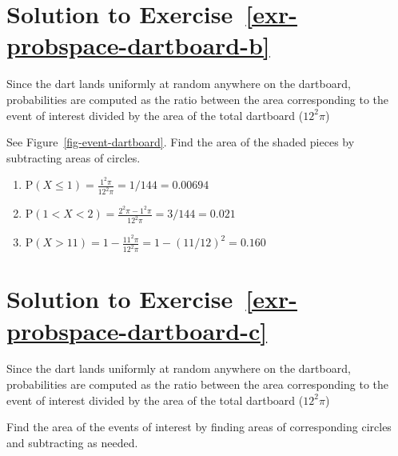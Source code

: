 \documentclass[
  letterpaper,
  DIV=11,
  numbers=noendperiod]{scrreprt}
\providecommand{\tightlist}{%
  \setlength{\itemsep}{0pt}\setlength{\parskip}{0pt}}
\theoremstyle{plain}
\theoremstyle{definition}
\theoremstyle{definition}
\theoremstyle{definition}
\theoremstyle{remark}
\begin{document}
\section{\texorpdfstring{Solution to
Exercise~\ref{exr-probspace-dartboard-b}}{Solution to Exercise~}}\label{solution-to-exr-probspace-dartboard-b}

Since the dart lands uniformly at random anywhere on the dartboard,
probabilities are computed as the ratio between the area corresponding
to the event of interest divided by the area of the total dartboard
(\(12^2\pi\))

See Figure~\ref{fig-event-dartboard}. Find the area of the shaded pieces
by subtracting areas of circles.

\begin{enumerate}
\def\labelenumi{\arabic{enumi}.}
\tightlist
\item
  \(\text{P}(X \le 1) = \frac{1^2\pi}{12^2\pi} = 1/144 = 0.00694\)
\item
  \(\text{P}(1 < X < 2) = \frac{2^2\pi - 1^2\pi}{12^2\pi} = 3/144 = 0.021\)
\item
  \(\text{P}(X > 11) = 1 - \frac{11^2\pi}{12^2\pi} = 1 - (11/12)^2 = 0.160\)
\end{enumerate}

\section{\texorpdfstring{Solution to
Exercise~\ref{exr-probspace-dartboard-c}}{Solution to Exercise~}}\label{solution-to-exr-probspace-dartboard-c}

Since the dart lands uniformly at random anywhere on the dartboard,
probabilities are computed as the ratio between the area corresponding
to the event of interest divided by the area of the total dartboard
(\(12^2\pi\))

Find the area of the events of interest by finding areas of
corresponding circles and subtracting as needed.
\end{document}
